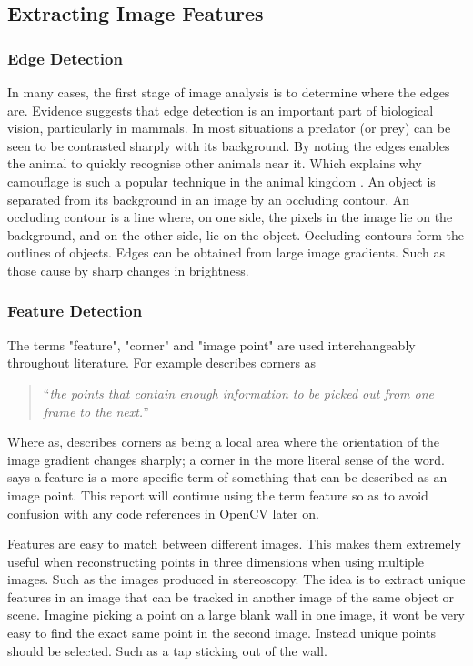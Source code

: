 \documentclass[11pt,oneside]{report}
\begin{document}
				\subsection{Extracting Image Features}
					\subsubsection{Edge Detection}
					In many cases, the first stage of image analysis is to determine where the edges are.
					Evidence suggests that edge detection is an important part of biological vision, particularly in mammals.
					In most situations a predator (or prey) can be seen to be contrasted sharply with its background.
					By noting the edges enables the animal to quickly recognise other animals near it.
					Which explains why camouflage is such a popular technique in the animal kingdom \cite{book:aiIlluminated}.
					An object is separated from its background in an image by an occluding contour.
					An occluding contour is a line where, on one side, the pixels in the image lie on the background, and on the other side, lie on the object.
					Occluding contours form the outlines of objects.
					Edges can be obtained from large image gradients.
					Such as those cause by sharp changes in brightness.
					\subsubsection{Feature Detection}
					The terms "feature", "corner" and "image point" are used interchangeably throughout literature.
					For example  describes corners as
					\begin{quote}
						``\textit{the points that contain enough information to be picked out from one frame to the next.}''
					\end{quote}
					Where as,  describes corners as being a local area where the orientation of the image gradient changes sharply; a corner in the more literal sense of the word.
					 says a feature is a more specific term of something that can be described as an image point.
					This report will continue using the term feature so as to avoid confusion with any code references in OpenCV later on.
					
					Features are easy to match between different images.
					This makes them extremely useful when reconstructing points in three dimensions when using multiple images.
					Such as the images produced in stereoscopy.
					The idea is to extract unique features in an image that can be tracked in another image of the same object or scene.
					Imagine picking a point on a large blank wall in one image, it wont be very easy to find the exact same point in the second image.
					Instead unique points should be selected.
					Such as a tap sticking out of the wall.
					
\end{document}
